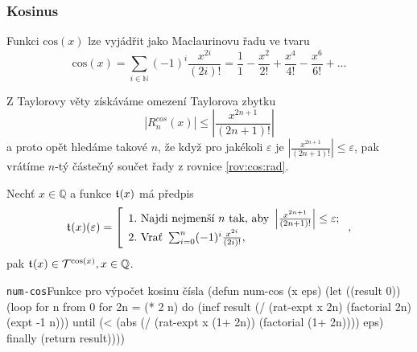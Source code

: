 \subsubsection{Kosinus}
\begin{fact}\label{vet:cos_jako_rada}
Funkci $\mathrm{cos}(x)$ lze vyjádřit jako Maclaurinovu řadu ve tvaru
\begin{equation}\label{rov:cos:rad}
\mathrm{cos}(x) = \sum_{i\in\mathbb{N}}(-1)^i \frac{x^{2i}}{(2i)!} = \frac{1}{1} - \frac{x^2}{2!} + \frac{x^4}{4!} - \frac{x^6}{6!} + \ldots
\end{equation}
\end{fact}

Z Taylorovy věty získáváme omezení Taylorova zbytku
\begin{equation}
|R^{cos}_n(x)|\leq\left|\frac{x^{2n+1}}{(2n+1)!}\right|
\end{equation}
a proto opět hledáme takové $n$, že když pro jakékoli $\varepsilon$ je $|\frac{x^{2n+1}}{(2n+1)!}|\leq\varepsilon$, pak vrátíme $n$-tý částečný součet řady z rovnice \eqref{rov:cos:rad}.
\begin{consequence} Nechť $x\in\mathbb{Q}$ a funkce $\mathfrak{t}^{}(x)$ má předpis
\begin{equation}
\mathfrak{t}^{}(x)(\varepsilon)=\left[\begin{array}{l}\mathrm{1.~}\text{Najdi~nejmenší~}n\text{~tak,~aby~}\left|\frac{x^{2n+1}}{(2n+1)!}\right| \leq \varepsilon;\\
\mathrm{2.~}\text{Vrať~}\sum_{i=0}^n (-1)^i \frac{x^{2i}}{(2i)!},\end{array}\right.,
\end{equation}
pak $\mathfrak{t}^{}(x)\in\mathcal{T}^{\mathrm{cos}(x)},x\in\mathbb{Q}$.
\end{consequence}\clearpage\begin{lispcode}{\texttt{num-cos}}{Funkce pro výpočet kosinu čísla}
(\textcolor{funkcionalni}{defun} \textcolor{pojmenovan}{num-cos} (x eps)
  (\textcolor{vedlejsi}{let} ((result 0))
    (\textcolor{funkcionalni}{loop} \textcolor{obarvi}{for} n \textcolor{obarvi}{from} 0
          \textcolor{obarvi}{for} 2n = (\textcolor{matematicke}{*} 2 n)
          \textcolor{obarvi}{do} (\textcolor{vedlejsi}{incf} result
                   (\textcolor{matematicke}{/} (\textcolor{moje}{rat-expt} x 2n)
                      (\textcolor{moje}{factorial} 2n)
                      (\textcolor{matematicke}{expt} -1 n)))
          \textcolor{obarvi}{until} (\textcolor{matematicke}{<} (\textcolor{matematicke}{abs} (\textcolor{matematicke}{/} (\textcolor{moje}{rat-expt} x (\textcolor{matematicke}{1+} 2n))
                           (\textcolor{moje}{factorial} (\textcolor{matematicke}{1+} 2n))))
                   eps)
          \textcolor{obarvi}{finally} (\textcolor{funkcionalni}{return} result))))
\end{lispcode}

